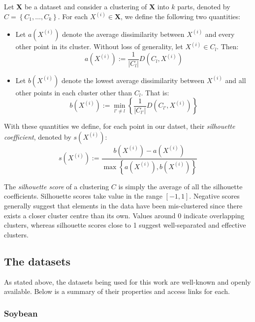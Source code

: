 \begin{definition}\label{def:silhouette}
    Let \textbf{X} be a dataset and consider a clustering of \textbf{X} into
    \(k\) parts, denoted by \(C = \left\{C_1, \ldots, C_k\right\}\). For each
    \(X^{(i)} \in \textbf{X}\), we define the following two quantities:
    \begin{itemize}
        \item Let \(a\left(X^{(i)}\right)\) denote the average dissimilarity
            between \(X^{(i)}\) and every other point in its cluster. Without
            loss of generality, let \(X^{(i)} \in C_l\). Then:
            \[
                a\left(X^{(i)}\right) := \frac{1}{|C_l|} D\left(C_l,
                X^{(i)}\right)
            \]
        \item Let \(b\left(X^{(i)}\right)\) denote the lowest average 
            dissimilarity between \(X^{(i)}\) and all other points in each
            cluster other than \(C_l\). That is:
            \[
                b\left(X^{(i)}\right) := \min_{l' \neq l} \left\{
                \frac{1}{|C_{l'}|} D\left(C_{l'}, X^{(i)}\right) \right\}
            \]
    \end{itemize}

    With these quantities we define, for each point in our datset, their
    \emph{silhouette coefficient}, denoted by \(s(X^{(i)})\):
    \[
        s(X^{(i)}) := \frac{b\left(X^{(i)}\right) -
        a\left(X^{(i)}\right)}{\max\left\{a\left(X^{(i)}\right),
        b\left(X^{(i)}\right)\right\}}
    \]

    The \emph{silhouette score} of a clustering \(C\) is simply the average of
all the silhouette coefficients. Silhouette scores take value in the range
\([-1, 1]\). Negative scores generally suggest that elements in the data have
been mis-clustered since there exists a closer cluster centre than its own.
Values around 0 indicate overlapping clusters, whereas silhouette scores close
to 1 suggest well-separated and effective clusters.
\end{definition}


\subsection{The datasets}\label{subsec:datasets}

As stated above, the datasets being used for this work are well-known and openly
available. Below is a summary of their properties and access links for each.

\subsubsection*{Soybean}

